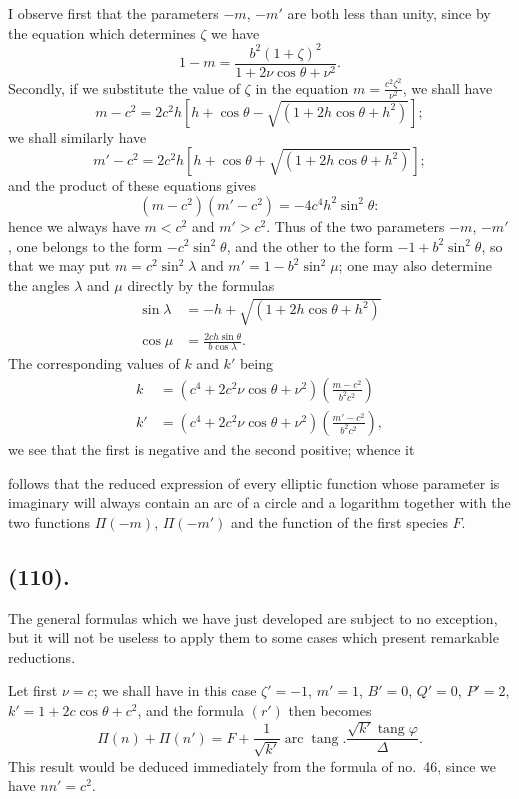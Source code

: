 \documentclass{article}
\begin{document}
I observe first that the parameters $-m$, $-m'$ are both less than unity, since by the equation which determines $\zeta$ we have
\[ 1-m=\frac{b^{2}(1+\zeta)^{2}}{1+2\nu\cos\theta+\nu^{2}}. \]
Secondly, if we substitute the value of $\zeta$ in the equation $m=\frac{c^{2}\zeta^{2}}{\nu^{2}}$, we shall have
\[ m-c^{2}=2c^{2}h[h+\cos\theta-\sqrt{(1+2h\cos\theta+h^{2})}]; \]
we shall similarly have
\[ m'-c^{2}=2c^{2}h[h+\cos\theta+\sqrt{(1+2h\cos\theta+h^{2})}]; \]
and the product of these equations gives
\[ (m-c^{2})(m'-c^{2})=-4c^{4}h^{2}\sin^{2}\theta: \]
hence we always have $m<c^{2}$ and $m'>c^{2}$. Thus of the two parameters $-m$, $-m'$, one belongs to the form $-c^{2}\sin^{2}\theta$, and the other to the form $-1+b^{2}\sin^{2}\theta$, so that we may put $m=c^{2}\sin^{2}\lambda$ and $m'=1-b^{2}\sin^{2}\mu$; one may also determine the angles $\lambda$ and $\mu$ directly by the formulas
\[ \begin{aligned} \sin\lambda&=-h+\sqrt{(1+2h\cos\theta+h^{2})}\\ \cos\mu&=\frac{2ch\sin\theta}{b\cos\lambda}. \end{aligned} \]
The corresponding values of $k$ and $k'$ being
\[ \begin{aligned} k&=(c^{4}+2c^{2}\nu\cos\theta+\nu^{2})\left(\frac{m-c^{2}}{b^{2}c^{2}}\right)\\ k'&=(c^{4}+2c^{2}\nu\cos\theta+\nu^{2})\left(\frac{m'-c^{2}}{b^{2}c^{2}}\right), \end{aligned} \]
we see that the first is negative and the second positive; whence it

follows that the reduced expression of every elliptic function whose parameter is imaginary will always contain an arc of a circle and a logarithm together with the two functions $\Pi(-m)$, $\Pi(-m')$ and the function of the first species $F$.

\subsection*{(110).}

The general formulas which we have just developed are subject to no exception, but it will not be useless to apply them to some cases which present remarkable reductions.

Let first $\nu=c$; we shall have in this case $\zeta'=-1$, $m'=1$, $B'=0$, $Q'=0$, $P'=2$, $k'=1+2c\cos\theta+c^{2}$, and the formula $(r')$ then becomes
\[ \Pi(n)+\Pi(n')=F+\frac{1}{\sqrt{k'}}\operatorname{arc}\operatorname{tang}.\frac{\sqrt{k'}\operatorname{tang}\varphi}{\Delta}. \]
This result would be deduced immediately from the formula of no.\ 46, since we have $nn'=c^{2}$.
\end{document}
